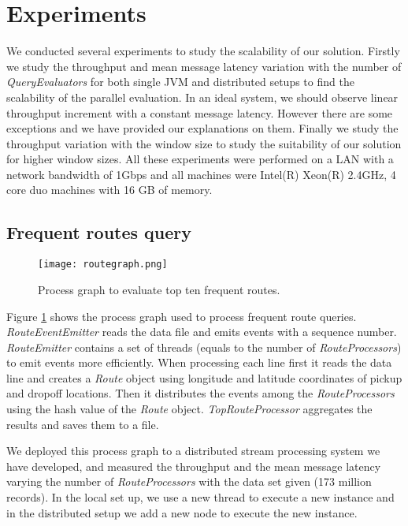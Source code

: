 \section{Experiments}
We conducted several experiments to study the scalability of our solution. Firstly we study the throughput and mean message latency variation with the number of \textit{QueryEvaluators} for both single JVM and distributed setups to find the scalability of the parallel evaluation. In an ideal system, we should observe linear throughput increment with a constant message latency. However there are some exceptions and we have provided our explanations on them. Finally we study the throughput variation with the window size to study the suitability of our solution for higher window sizes. All these experiments were performed on a LAN with a network bandwidth of 1Gbps and all machines were Intel(R) Xeon(R) 2.4GHz, 4 core duo machines with 16 GB of memory. 

\subsection{Frequent routes query}

\begin{figure}[!t]
        \centering
        \texttt{[image: routegraph.png]}
        \caption{Process graph to evaluate top ten frequent routes.}
        \label{routegraph}
\end{figure}

Figure \ref{routegraph} shows the process graph used to process frequent route queries. \textit{RouteEventEmitter} reads the data file and emits events with a sequence number. \textit{RouteEmitter} contains a set of threads (equals to the number of \textit{RouteProcessors}) to emit events more efficiently. When processing each line first it reads the data line and creates a \textit{Route} object using longitude and latitude coordinates of pickup and dropoff locations. Then it distributes the events among the \textit{RouteProcessors} using the hash value of the \textit{Route} object. \textit{TopRouteProcessor} aggregates the results and saves them to a file.

We deployed this process graph to a distributed stream processing system we have developed, and  measured the throughput and the mean message latency varying the number of \textit{RouteProcessors} with the data set given (173 million records). In the local set up, we use a new thread to execute a new instance and in the distributed setup we add a new node to execute the new instance.

